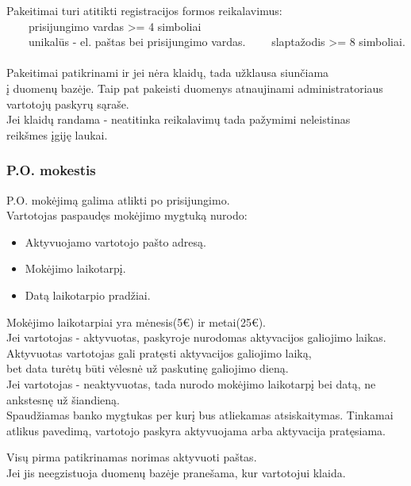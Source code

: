\documentclass[a4paper,12pt]{article}
\newcommand{\tabitem}{~~\llap{\textbullet}~~}
\begin{document}
Pakeitimai turi atitikti registracijos formos reikalavimus: \\
	\tabitem prisijungimo vardas >= 4 simboliai\\
	\tabitem unikalūs - el. paštas bei prisijungimo vardas.
    \tabitem slaptažodis >= 8 simboliai. \\\\
    
Pakeitimai patikrinami ir jei nėra klaidų, tada užklausa siunčiama \\
į duomenų bazėje. Taip pat pakeisti duomenys atnaujinami administratoriaus \\
vartotojų paskyrų sąraše. \\
Jei klaidų randama - neatitinka reikalavimų tada pažymimi neleistinas \\
reikšmes įgiję laukai.\\

\subsubsection{P.O. mokestis}
P.O. mokėjimą galima atlikti po prisijungimo. \\
Vartotojas paspaudęs mokėjimo mygtuką nurodo:
\begin{itemize}
	\item Aktyvuojamo vartotojo pašto adresą.
	\item Mokėjimo laikotarpį.
	\item Datą laikotarpio pradžiai.
\end{itemize} 
Mokėjimo laikotarpiai yra mėnesis(5€) ir metai(25€). \\
Jei vartotojas - aktyvuotas, paskyroje nurodomas aktyvacijos galiojimo laikas.\\
Aktyvuotas vartotojas gali pratęsti aktyvacijos galiojimo laiką, \\
bet data turėtų būti vėlesnė už paskutinę galiojimo dieną.\\
Jei vartotojas - neaktyvuotas, tada nurodo mokėjimo laikotarpį bei datą,
ne ankstesnę už šiandieną. \\
Spaudžiamas banko mygtukas per kurį bus atliekamas atsiskaitymas.
Tinkamai atlikus pavedimą, vartotojo paskyra aktyvuojama arba aktyvacija pratęsiama.

Visų pirma patikrinamas norimas aktyvuoti paštas. \\
Jei jis neegzistuoja duomenų bazėje pranešama, kur vartotojui klaida.\\
\end{document}
